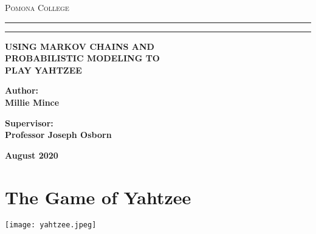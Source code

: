 \documentclass[12pt,a4paper]{article}
\begin{document}
\begin{titlepage}
\begin{center}
{{\Large{\textsc{Pomona College}}}} \rule[0.1cm]{15.8cm}{0.1mm}
\rule[0.5cm]{15.8cm}{0.6mm}
\end{center}
\vspace{15mm}
\begin{center}
{\LARGE{\bf USING MARKOV CHAINS AND \\ PROBABILISTIC MODELING TO \\ \vspace{5mm} PLAY YAHTZEE}}
\end{center}
\vspace{35mm}
\par
\noindent
\begin{minipage}[t]{0.47\textwidth}
{\large{\bf Author:\\
Millie Mince\\}}
\end{minipage}
\hfill
\begin{minipage}[t]{0.47\textwidth}\raggedleft
{\large{\bf Supervisor:\\
Professor Joseph Osborn}}
\end{minipage}
\hfill

\vspace{70mm}
\begin{center}
{\large{\bf August 2020 }}
\end{center}
\end{titlepage}

\section{The Game of Yahtzee}
\begin{center}
\texttt{[image: yahtzee.jpeg]}
\end{center}
\end{document}
